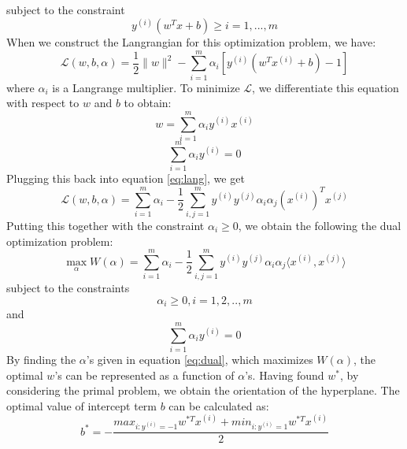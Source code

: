 \documentclass[%
        final,
        notitlepage,
        narroweqnarray,
        inline,
        ]{ieee}
\begin{document}
subject to the constraint
\begin{equation}
y^{(i)}(w^Tx + b) \geq i = 1, ..., m
\end{equation}
When we construct the Langrangian for this optimization problem, we have:
\begin{equation} \label{eq:lang}
\mathcal {L}(w, b, \alpha) = \frac{1}{2} \parallel w \parallel ^2 - \sum_{i=1}^{m} \alpha_i [y^{(i)}(w^Tx^{(i)} + b) - 1]
\end{equation}
where $\alpha_{i}$ is a Langrange multiplier. To minimize $\mathcal{L}$, we differentiate this equation with respect to $w$ and $b$ to obtain:
\begin{equation} \label{eq:w}
w = \sum_{i=1}^{m} \alpha_{i} y^{(i)} x^{(i)}
\end{equation}
\begin{equation} \label{eq:ay}
\sum_{i=1}^{m} \alpha_{i} y^{(i)} = 0
\end{equation}
Plugging this back into equation \ref{eq:lang}, we get
\begin{equation}
\mathcal {L}(w, b, \alpha) = \sum_{i=1}^{m} \alpha_i - \frac{1}{2} \sum_{i,j=1}^{m} y^{(i)}y^{(j)}\alpha_i \alpha_j (x^{(i)})^T x^{(j)}
\end{equation}
Putting this together with the constraint $\alpha_i \geq 0$, we obtain the following the dual optimization problem:
\begin{equation} \label{eq:dual}
\max_{\alpha} W(\alpha) = \sum_{i=1}^{m} \alpha_i - \frac{1}{2} \sum_{i,j=1}^{m} y^{(i)}y^{(j)}\alpha_i \alpha_j \langle x^{(i)}, x^{(j)}\rangle
\end{equation}
subject to the constraints
\begin{equation}
\alpha_{i} \geq 0, i = 1,2,..,m
\end{equation}
and
\begin{equation}
\sum_{i=1}^{m} \alpha_{i}y^{(i)} = 0
\end{equation}
By finding the $\alpha$'s given in equation \ref{eq:dual}, which maximizes $W(\alpha)$, the optimal $w$'s can be represented as a function of $\alpha$'s.
Having found $w^{*}$, by considering the primal problem, we obtain the orientation of the hyperplane.
The optimal value of intercept term $b$ can be calculated as:
\begin{equation}
b^{*} = - \frac {max_{i:y^{(i)}=-1}w^{*T}x^{(i)} + min_{i:y^{(i)}=1}w^{*T}x^{(i)}} {2}
\end{equation}
\end{document}
